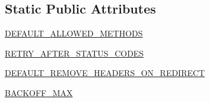 \subsection*{Static Public Attributes}
\begin{DoxyCompactItemize}
\item 
\hyperlink{classpip_1_1__vendor_1_1urllib3_1_1util_1_1retry_1_1Retry_aa0d84a8e8bb7e6c1bbe686ac387e7806}{D\+E\+F\+A\+U\+L\+T\+\_\+\+A\+L\+L\+O\+W\+E\+D\+\_\+\+M\+E\+T\+H\+O\+DS}
\item 
\hyperlink{classpip_1_1__vendor_1_1urllib3_1_1util_1_1retry_1_1Retry_aad3195d56cb6f1bd5466c1d136380e55}{R\+E\+T\+R\+Y\+\_\+\+A\+F\+T\+E\+R\+\_\+\+S\+T\+A\+T\+U\+S\+\_\+\+C\+O\+D\+ES}
\item 
\hyperlink{classpip_1_1__vendor_1_1urllib3_1_1util_1_1retry_1_1Retry_add72291e56194268f29730be6724190e}{D\+E\+F\+A\+U\+L\+T\+\_\+\+R\+E\+M\+O\+V\+E\+\_\+\+H\+E\+A\+D\+E\+R\+S\+\_\+\+O\+N\+\_\+\+R\+E\+D\+I\+R\+E\+CT}
\item 
\hyperlink{classpip_1_1__vendor_1_1urllib3_1_1util_1_1retry_1_1Retry_aea1fdfe85dae20660bd57822dda850ab}{B\+A\+C\+K\+O\+F\+F\+\_\+\+M\+AX}
\end{DoxyCompactItemize}


